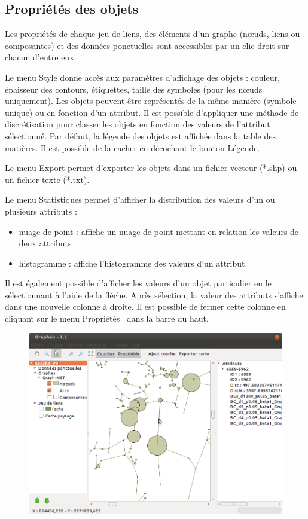 \documentclass{article}
\begin{document}
\subsection{Propriétés des objets}
\label{properties}
Les propriétés de chaque jeu de liens, des éléments d’un graphe (nœuds, liens ou composantes) et des données ponctuelles sont accessibles par un clic droit sur chacun d’entre eux.

Le menu Style donne accès aux paramètres d’affichage des objets : couleur, épaisseur des contours, étiquettes, taille des symboles (pour les nœuds uniquement). Les objets peuvent être représentés de la même manière (symbole unique) ou en fonction d’un attribut. Il est possible d’appliquer une méthode de discrétisation pour classer les objets en fonction des valeurs de l’attribut sélectionné. Par défaut, la légende des objets est affichée dans la table des matières. Il est possible de la cacher en décochant le bouton Légende.

Le menu Export permet d’exporter les objets dans un fichier vecteur (*.shp) ou un fichier texte (*.txt).

Le menu Statistiques permet d’afficher la distribution des valeurs d’un ou plusieurs attributs : 
\begin{itemize}
	\item nuage de point : affiche un nuage de point mettant en relation les valeurs de deux attributs
	\item histogramme : affiche l’histogramme des valeurs d’un attribut.
\end{itemize}

Il est également possible d’afficher les valeurs d’un objet particulier en le sélectionnant à l’aide de la flèche. Après sélection, la valeur des attributs s’affiche dans une nouvelle colonne à droite. Il est possible de fermer cette colonne en cliquant sur le menu  Propriétés~ dans la barre du haut.

\begin{figure}[H]
	\includegraphics[scale=0.5]{img/manual-fr_img19.png} 
\end{figure}
\end{document}
